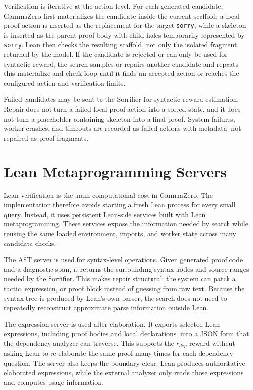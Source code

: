 Verification is iterative at the action level. For each generated candidate, GammaZero first materializes the candidate inside the current scaffold: a local proof action is inserted as the replacement for the target \texttt{sorry}, while a skeleton is inserted as the parent proof body with child holes temporarily represented by \texttt{sorry}. Lean then checks the resulting scaffold, not only the isolated fragment returned by the model. If the candidate is rejected or can only be used for syntactic reward, the search samples or repairs another candidate and repeats this materialize-and-check loop until it finds an accepted action or reaches the configured action and verification limits.

Failed candidates may be sent to the Sorrifier for syntactic reward estimation. Repair does not turn a failed local proof action into a solved state, and it does not turn a placeholder-containing skeleton into a final proof. System failures, worker crashes, and timeouts are recorded as failed actions with metadata, not repaired as proof fragments.

\section{Lean Metaprogramming Servers}

Lean verification is the main computational cost in GammaZero. The implementation therefore avoids
starting a fresh Lean process for every small query. Instead, it uses persistent Lean-side services built
with Lean metaprogramming. These services expose the information needed by search while reusing the
same loaded environment, imports, and worker state across many candidate checks.

The AST server is used for syntax-level operations. Given generated proof code and a diagnostic span, it
returns the surrounding syntax nodes and source ranges needed by the Sorrifier. This makes repair
structural: the system can patch a tactic, expression, or proof block instead of guessing from raw text.
Because the syntax tree is produced by Lean's own parser, the search does not need to repeatedly
reconstruct approximate parse information outside Lean.

The expression server is used after elaboration. It exports selected Lean expressions, including proof
bodies and local declarations, into a JSON form that the dependency analyzer can traverse. This supports
the \(r_{dep}\) reward without asking Lean to re-elaborate the same proof many times for each dependency
question. The server also keeps the boundary clear: Lean produces authoritative elaborated expressions,
while the external analyzer only reads those expressions and computes usage information.

